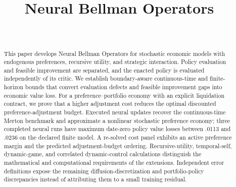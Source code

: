 \documentclass[ecta]{econsocart}
\theoremstyle{remark}
\begin{document}
\begin{frontmatter}
\title{Neural Bellman Operators}
\begin{aug}
\author[id=au1,addressref={add1}]{~}
\address[id=add1]{}
\end{aug}
\begin{abstract}
This paper develops Neural Bellman Operators for stochastic economic models with endogenous preferences, recursive utility, and strategic interaction. Policy evaluation and feasible improvement are separated, and the enacted policy is evaluated independently of its critic. We establish boundary-aware continuous-time and finite-horizon bounds that convert evaluation defects and feasible improvement gaps into economic value loss. For a preference--portfolio economy with an explicit liquidation contract, we prove that a higher adjustment cost reduces the optimal discounted preference-adjustment budget. Executed neural updates recover the continuous-time Merton benchmark and approximate a nonlinear stochastic preference economy; three completed neural runs have maximum date-zero policy value losses between .0113 and .0236 on the declared finite model. A re-solved cost panel exhibits an active preference margin and the predicted adjustment-budget ordering. Recursive-utility, temporal-self, dynamic-game, and correlated dynamic-control calculations distinguish the mathematical and computational requirements of the extensions. Independent error definitions expose the remaining diffusion-discretization and portfolio-policy discrepancies instead of attributing them to a small training residual.
\end{abstract}
\begin{keyword}
\end{keyword}
\end{frontmatter}

\begin{appendix}

\end{appendix}
\end{document}
